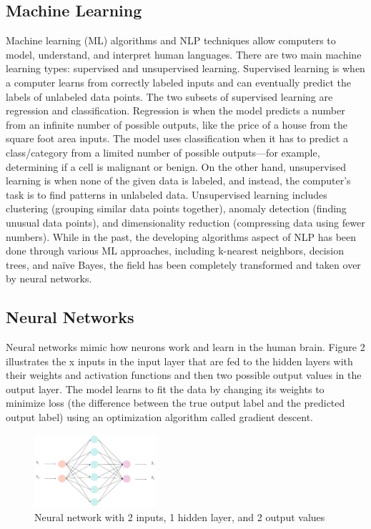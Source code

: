 \documentclass[11pt]{article}
\begin{document}
\subsection{Machine Learning}

Machine learning (ML) algorithms and NLP techniques allow computers to model, understand, and interpret human languages. There are two main machine learning types: supervised and unsupervised learning. Supervised learning is when a computer learns from correctly labeled inputs and can eventually predict the labels of unlabeled data points. The two subsets of supervised learning are regression and classification. Regression is when the model predicts a number from an infinite number of possible outputs, like the price of a house from the square foot area inputs. The model uses classification when it has to predict a class/category from a limited number of possible outputs—for example, determining if a cell is malignant or benign.
On the other hand, unsupervised learning is when none of the given data is labeled, and instead, the computer’s task is to find patterns in unlabeled data. Unsupervised learning includes clustering (grouping similar data points together), anomaly detection (finding unusual data points), and dimensionality reduction (compressing data using fewer numbers). While in the past, the developing algorithms aspect of NLP has been done through various ML approaches, including k-nearest neighbors, decision trees, and naïve Bayes, the field has been completely transformed and taken over by neural networks. 

\subsection{Neural Networks}
Neural networks mimic how neurons work and learn in the human brain. Figure 2 illustrates the x inputs in the input layer that are fed to the hidden layers with their weights and activation functions and then two possible output values in the output layer. The model learns to fit the data by changing its weights to minimize loss (the difference between the true output label and the predicted output label) using an optimization algorithm called gradient descent. 

\begin{figure}
\centering
\includegraphics[width=0.4\textwidth]{nn.png}
\caption{Neural network with 2 inputs, 1 hidden layer, and 2 output values}
\end{figure}
\end{document}
